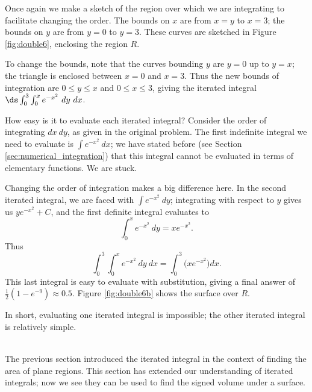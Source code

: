 {Once again we make a sketch of the region over which we are integrating to facilitate changing the order. The bounds on $x$ are from $x=y$ to $x=3$; the bounds on $y$ are from $y=0$ to $y=3$. These curves are sketched in Figure \ref{fig:double6}, enclosing the region $R$.


To change the bounds, note that the curves bounding $y$ are $y=0$ up to $y=x$; the triangle is enclosed between $x=0$ and $x=3$. Thus the new bounds of integration are $0\leq y\leq x$ and $0\leq x\leq 3$, giving the iterated integral $\ds \int_0^3\int_0^x e^{-x^2}\ dy\ dx$.

How easy is it to evaluate each iterated integral? Consider the order of integrating $dx\ dy$, as given in the original problem. The first indefinite integral we need to evaluate is $\int e^{-x^2}\ dx$; we have stated before (see Section \ref{sec:numerical_integration}) that this integral cannot be evaluated in terms of elementary functions. We are stuck.

Changing the order of integration makes a big difference here. In the second iterated integral, we are faced with $\int e^{-x^2}\ dy$; integrating with respect to $y$ gives us $ye^{-x^2}+C$, and the first definite integral evaluates to 
$$\int_0^x e^{-x^2}\ dy = xe^{-x^2}.$$
Thus 
$$\int_0^3\int_0^x e^{-x^2}\ dy\ dx = \int_0^3\Big(xe^{-x^2}\Big)dx.$$
This last integral is easy to evaluate with substitution, giving a final answer of $\frac12(1-e^{-9})\approx 0.5$. Figure \ref{fig:double6b} shows the surface over $R$.
 

In short, evaluating one iterated integral is impossible; the other iterated integral is relatively simple.
}\\

The previous section introduced the iterated integral in the context of finding the area of plane regions. This section has extended our understanding of iterated integrals; now we see they can be used to find the signed volume under a surface. 

